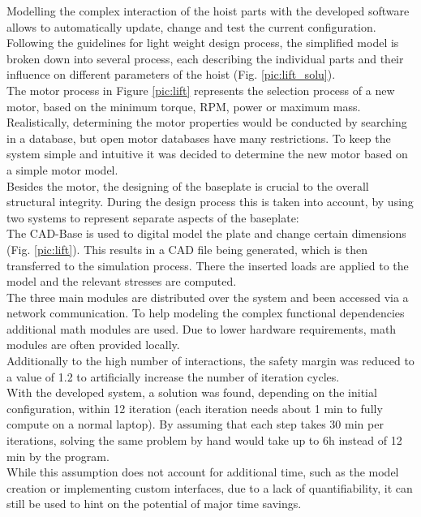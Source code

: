 Modelling the complex interaction of the hoist parts with the developed software allows to automatically update, change and test the current configuration.
Following the guidelines for light weight design process, the simplified model is broken down into several process, each describing the individual parts and 
their influence on different parameters of the hoist (Fig. \ref{pic:lift_solu}).\\
The motor process in Figure \ref{pic:lift} represents the selection process of a new motor, 
based on the minimum torque, RPM, power or maximum mass.
Realistically, determining the motor properties would be conducted by searching in a database, 
but open motor databases have many restrictions.
To keep the system simple and intuitive 
it was decided to determine the new motor based on a simple motor model.\\
Besides the motor, the designing of the baseplate is crucial to the overall structural integrity.
During the design process this is taken into account, by using two systems to represent separate aspects of the baseplate:\\
The CAD-Base is used to digital model the plate and change certain dimensions (Fig. \ref{pic:lift}).
This results in a CAD file being generated, which is then transferred to the simulation process.
There the inserted loads are applied to the model and the relevant stresses are computed.\\
The three main modules are distributed over the system and been accessed via a network communication.
To help modeling the complex functional dependencies additional math modules are used.
Due to lower hardware requirements, math modules are often provided locally.\\
Additionally to the high number of interactions, the safety margin was reduced to a value of 1.2 to 
artificially increase the number of iteration cycles.\\
With the developed system, a solution was found, depending on the initial configuration, within 12 iteration (each iteration needs about 1 min to fully compute on a normal laptop).
By assuming that each step takes 30 min per iterations, solving the same problem by hand would take up to 6h instead of 12 min by the program.\\
While this assumption does not account for additional time, such as the model creation or implementing custom interfaces, 
due to a lack of quantifiability, it can still be used to hint on the potential of major time savings. 


